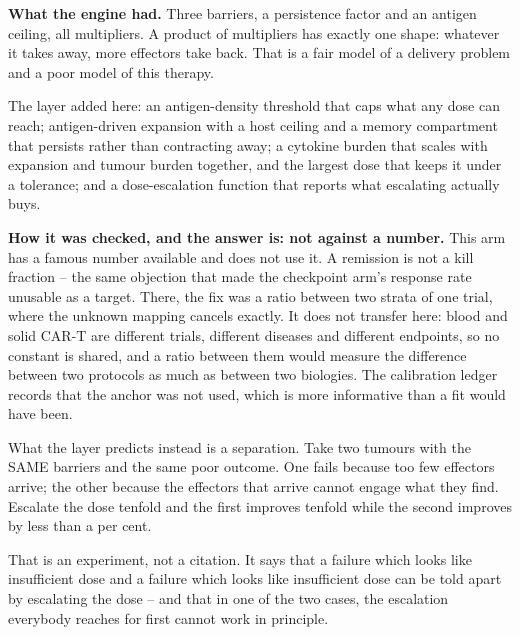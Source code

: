\documentclass[11pt,twoside,openright]{report}
\begin{document}
\textbf{What the engine had.} Three barriers, a persistence factor and an antigen ceiling, all multipliers. A product of multipliers has exactly one shape: whatever it takes away, more effectors take back. That is a fair model of a delivery problem and a poor model of this therapy.

\begin{numbers}
The layer added here: an antigen-density threshold that caps what any dose can reach; antigen-driven expansion with a host ceiling and a memory compartment that persists rather than contracting away; a cytokine burden that scales with expansion and tumour burden together, and the largest dose that keeps it under a tolerance; and a dose-escalation function that reports what escalating actually buys.
\end{numbers}

\textbf{How it was checked, and the answer is: not against a number.} This arm has a famous number available and does not use it. A remission is not a kill fraction -- the same objection that made the checkpoint arm's response rate unusable as a target. There, the fix was a ratio between two strata of one trial, where the unknown mapping cancels exactly. It does not transfer here: blood and solid CAR-T are different trials, different diseases and different endpoints, so no constant is shared, and a ratio between them would measure the difference between two protocols as much as between two biologies. The calibration ledger records that the anchor was not used, which is more informative than a fit would have been.

\begin{finding}
What the layer predicts instead is a separation. Take two tumours with the SAME barriers and the same poor outcome. One fails because too few effectors arrive; the other because the effectors that arrive cannot engage what they find. Escalate the dose tenfold and the first improves tenfold while the second improves by less than a per cent.

That is an experiment, not a citation. It says that a failure which looks like insufficient dose and a failure which looks like insufficient dose can be told apart by escalating the dose -- and that in one of the two cases, the escalation everybody reaches for first cannot work in principle.
\end{finding}
\end{document}
